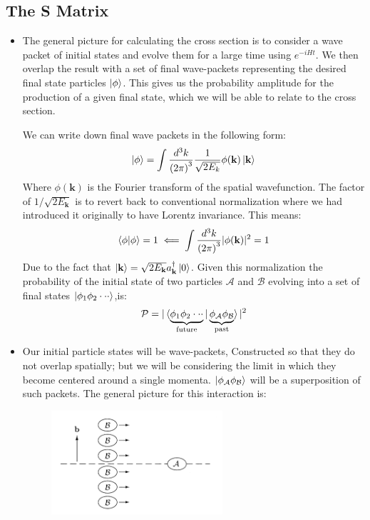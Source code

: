 \documentclass[11pt]{article}
\numberwithin{equation}{section}
\begin{document}
\subsection{The S Matrix} %
\label{sub:the_s_matrix}
\begin{itemize}
  \item The general picture for calculating the cross section is to consider a wave packet of initial states and evolve them for a large time using $e^{-iHt}$. We then overlap the result with a set of final wave-packets representing the desired final state particles $\ket{\phi}$. This gives us the probability amplitude for the production of a given final state, which we will be able to relate to the cross section. 

  We can write down final wave packets in the following form: 
  \begin{align*}
    \ket{\phi} = \int \frac{d^3k}{\left(2\pi\right)^3} \frac{1}{\sqrt{2E_{k}}}\phi(\textbf{k})\ket{\textbf{k}}
  \end{align*}
  Where $\phi(\textbf{k})$ is the Fourier transform of the spatial wavefunction. The factor of $1/\sqrt{2E_{\textbf{k}}}$ is to revert back to conventional normalization where we had introduced it originally to have Lorentz invariance. This means:
  \begin{align}
  \label{packet_norm}
     \braket{\phi|\phi} = 1 \impliedby \int \frac{d^3k}{\left(2\pi\right)^3}|\phi(\textbf{k})|^2 =1 
   \end{align}
   Due to the fact that $\ket{\textbf{k}} = \sqrt{2E_{\textbf{k}}}a^{\dagger}_{\textbf{k}}\ket{0}$. Given this normalization the probability of the initial state of two particles $\mathcal{A}$ and $\mathcal{B}$ evolving into a set of final states $\ket{\phi_1\phi_2 \cdot \cdot \cdot }$,is:
   \begin{align*}
     \mathcal{P} = |\braket{\underbrace{\phi_1\phi_2 \cdot \cdot \cdot}_{\text{future}} |\underbrace{\phi_{\mathcal{A}}\phi_{\mathcal{B}} }_{\text{past}}}|^2
   \end{align*}
   \item Our initial particle states will be wave-packets, Constructed so that they do not overlap spatially; but we will be considering the limit in which they become centered around a single momenta. $\ket{\phi_{\mathcal{A}}\phi_{\mathcal{B}}}$ will be a superposition of such packets. The general picture for this interaction is: 
\begin{figure}[H]
\centering
\includegraphics[width=0.6\textwidth]{Peskin_scattering.png}

\end{figure}
\end{itemize}
\end{document}
